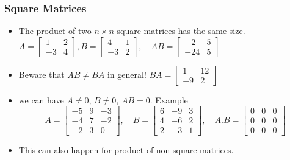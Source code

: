 \documentclass[8pt,dvipsnames]{beamer}
\begin{document}
\begin{frame}
  \frametitle{Square Matrices}
  \begin{itemize}
  \item The product of two $n\times n$ square matrices has the same size.
    $A= 
    \begin{bmatrix}
      1 & 2\\ -3 & 4
    \end{bmatrix}, B = 
    \begin{bmatrix}
      4 & 1\\
      -3 & 2
    \end{bmatrix}, \quad
    A B= 
    \begin{bmatrix}
      -2 & 5\\ -24& 5
    \end{bmatrix}
    $\vfill
  \item Beware that $A B \not = B A$ in general! $B A =
    \begin{bmatrix}
      1 & 12\\ -9 & 2
    \end{bmatrix}
    $\vfill
  \item we can have $A\not= 0$, $B\not = 0$, $AB = 0$. Example
    $$A =
    \begin{bmatrix}
      -5 & 9 & -3\\
      -4 & 7 & -2\\
      -2 & 3 & 0
    \end{bmatrix} ,\quad B=
    \begin{bmatrix}
      6 & -9 & 3\\
      4 & -6 & 2\\
      2 & -3 & 1
    \end{bmatrix},\quad A.B =
    \begin{bmatrix}
      0 & 0 & 0\\
      0 & 0 & 0\\
      0 & 0 & 0
    \end{bmatrix}
    $$\vfill
  \item This can also happen for product of non square matrices.
  \end{itemize}
\end{frame}  
  
\end{document}
